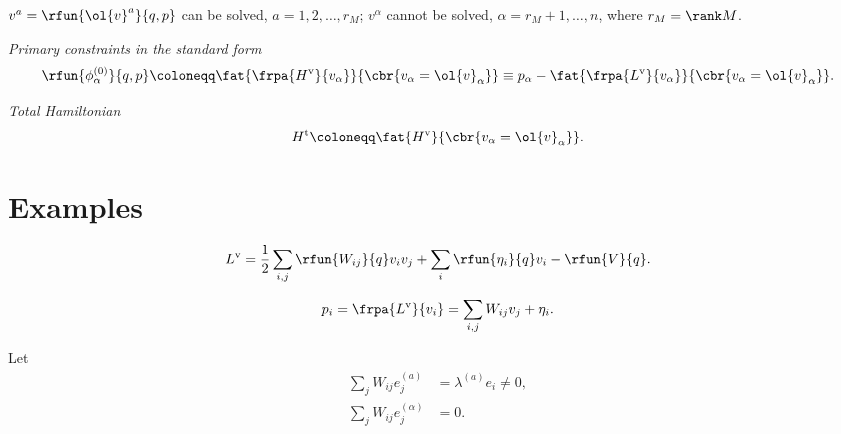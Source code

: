 \documentclass[a4paper,10pt]{article}
\begin{document}
$v^a = \rfun{\ol{v}^a}{q,p}$ can be solved, $a = 1, 2, \ldots, r_M$; $v^\alpha$ 
cannot be solved, $\alpha = r_M + 1, \ldots, n$, where $r_M = \rank M$.

\emph{Primary constraints in the standard form}
\begin{equation}
\rfun{\phi_\alpha^{(0)}}{q, p} \coloneqq
\fat{\frpa{H^\text{v}}{v_\alpha}}{\cbr{v_\alpha = \ol{v}_\alpha}} \equiv
p_\alpha - \fat{\frpa{L^\text{v}}{v_\alpha}}{\cbr{v_\alpha = \ol{v}_\alpha}}.
\end{equation}

\emph{Total Hamiltonian}
\begin{equation}
H^\text{t} \coloneqq \fat{H^\text{v}}{\cbr{v_\alpha = \ol{v}_\alpha}}.
\end{equation}









\section{Examples}

\begin{equation}
L^\text{v} = \frac{1}{2} \sum_{i,j}\rfun{W_{ij}}{q} v_i v_j + \sum_i 
\rfun{\eta_i}{q} 
v_i - \rfun{V}{q}.
\end{equation}

\begin{equation}
p_i = \frpa{L^\text{v}}{v_i} = \sum_{i,j} W_{ij} v_j + \eta_i.
\end{equation}

Let
\begin{align}
\sum_j W_{ij} e_j^{(a)} &= \lambda^{(a)} e_i \neq 0, \\
\sum_j W_{ij} e_j^{(\alpha)} &= 0.
\end{align}

\printbibliography
\end{document}
